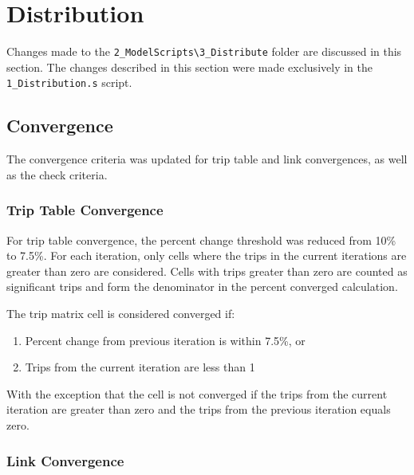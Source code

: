 \documentclass[
  letterpaper,
  DIV=11,
  numbers=noendperiod,
  titlepage=false]{scrreprt}
\providecommand{\tightlist}{%
  \setlength{\itemsep}{0pt}\setlength{\parskip}{0pt}}\usepackage{longtable,booktabs,array}
\begin{document}

\hypertarget{distribution}{%
\chapter{Distribution}\label{distribution}}

Changes made to the
\texttt{2\_ModelScripts\textbackslash{}3\_Distribute} folder are
discussed in this section. The changes described in this section were
made exclusively in the \texttt{1\_Distribution.s} script.

\hypertarget{convergence}{%
\section{Convergence}\label{convergence}}

The convergence criteria was updated for trip table and link
convergences, as well as the check criteria.

\hypertarget{trip-table-convergence}{%
\subsection{Trip Table Convergence}\label{trip-table-convergence}}

For trip table convergence, the percent change threshold was reduced
from 10\% to 7.5\%. For each iteration, only cells where the trips in
the current iterations are greater than zero are considered. Cells with
trips greater than zero are counted as significant trips and form the
denominator in the percent converged calculation.

The trip matrix cell is considered converged if:

\begin{enumerate}
\def\labelenumi{\arabic{enumi}.}
\tightlist
\item
  Percent change from previous iteration is within 7.5\%, or
\item
  Trips from the current iteration are less than 1
\end{enumerate}

With the exception that the cell is not converged if the trips from the
current iteration are greater than zero and the trips from the previous
iteration equals zero.

\hypertarget{link-convergence}{%
\subsection{Link Convergence}\label{link-convergence}}
\end{document}
